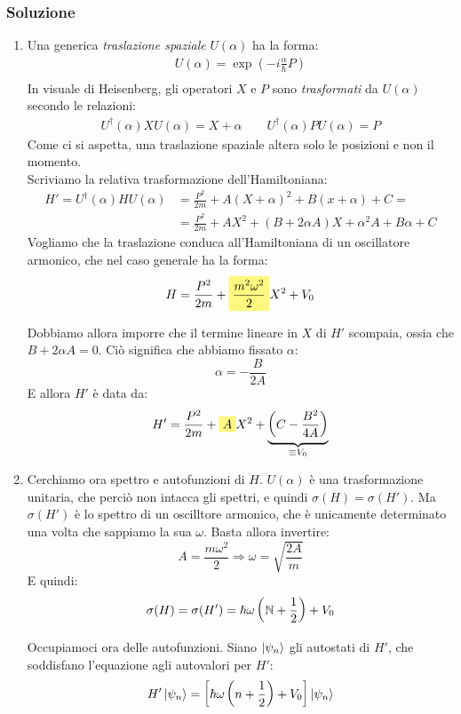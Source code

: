 \documentclass[../../FisicaTeorica.tex]{subfiles}
\begin{document}
\subsubsection{Soluzione}
\begin{enumerate}
\item Una generica \textit{traslazione spaziale} $U(\alpha)$  ha la forma:
\begin{align*}
U(\alpha) =\exp\left(-i\frac{\alpha}{\hbar}P\right)\\
\end{align*}
In visuale di Heisenberg, gli operatori $X$ e $P$ sono \textit{trasformati} da $U(\alpha)$ secondo le relazioni:
\begin{align*}
U^\dag (\alpha)XU(\alpha) = X+\alpha \qquad
 U^\dag (\alpha)PU(\alpha) = P
\end{align*}
Come ci si aspetta, una traslazione spaziale altera solo le posizioni e non il momento.\\

Scriviamo la relativa trasformazione dell'Hamiltoniana:
\begin{align*}
H' = U^\dag(\alpha)HU(\alpha) &= \frac{P^2}{2m}+ A(X+\alpha)^2 + B(x+\alpha) + C=\\
&=\frac{P^2}{2m} + AX^2 + (B+2\alpha A)X + \alpha^2 A + B\alpha +C
\end{align*}
Vogliamo che la traslazione conduca all'Hamiltoniana di un oscillatore armonico, che nel caso generale ha la forma:
\begin{align*}
H=\frac{P^2}{2m}+\hlc{Yellow}{\frac{m^2 \omega^2}{2}} X^2 + V_0
\end{align*}

Dobbiamo allora imporre che il termine lineare in $X$  di $H'$ scompaia, ossia che $B+2\alpha A = 0$. Ciò significa che abbiamo fissato $\alpha$:
\[
\alpha = -\frac{B}{2A}
\]
E allora $H'$ è data da:
\[
H' = \frac{P^2}{2m} + \hlc{Yellow}{A}X^2 + \underbrace{\left(C-\frac{B^2}{4A}\right)}_{\equiv V_0}
\]
\item Cerchiamo ora spettro e autofunzioni di $H$. $U(\alpha)$ è una trasformazione unitaria, che perciò non intacca gli spettri, e quindi $\sigma(H)=\sigma(H')$. Ma $\sigma(H')$ è lo spettro di un oscilltore armonico, che è unicamente determinato una volta che sappiamo la sua $\omega$. Basta allora invertire:
\[
A=\frac{m\omega^2}{2}\Rightarrow \omega = \sqrt{\frac{2A}{m}}
\]
E quindi:
\[
\sigma(H) = \sigma(H') = \hbar \omega\left(\mathbb{N}+\frac{1}{2}\right) + V_0
\]

Occupiamoci ora delle autofunzioni. Siano $\Ket{\psi_n}$ gli autostati di $H'$, che soddisfano l'equazione agli autovalori per $H'$:
\begin{align*}
H'\Ket{\psi_n} = \left[\hbar \omega \left(n+\frac{1}{2}\right) + V_0\right] \Ket{\psi_n}
\end{align*}


\end{enumerate}
\end{document}
